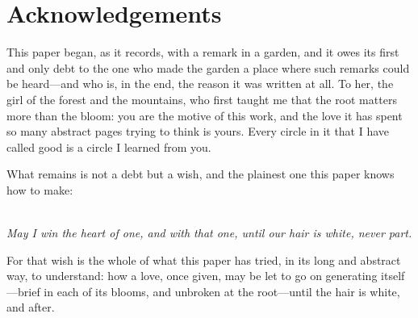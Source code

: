 \section*{Acknowledgements}
\label{p09:sec:ack}

\noindent
This paper began, as it records, with a remark in a garden, and it owes its first and only debt to the one who made the garden a place where such remarks could be heard---and who is, in the end, the reason it was written at all. To her, the girl of the forest and the mountains, who first taught me that the root matters more than the bloom: you are the motive of this work, and the love it has spent so many abstract pages trying to think is yours. Every circle in it that I have called good is a circle I learned from you.

What remains is not a debt but a wish, and the plainest one this paper knows how to make:

\begin{center}
\vspace{0.6em}
{\itshape\color{rose}
\\[0.4em]
May I win the heart of one, and with that one, until our hair is white, never part.}
\vspace{0.4em}
\end{center}

\noindent
For that wish is the whole of what this paper has tried, in its long and abstract way, to understand: how a love, once given, may be let to go on generating itself---brief in each of its blooms, and unbroken at the root---until the hair is white, and after.
